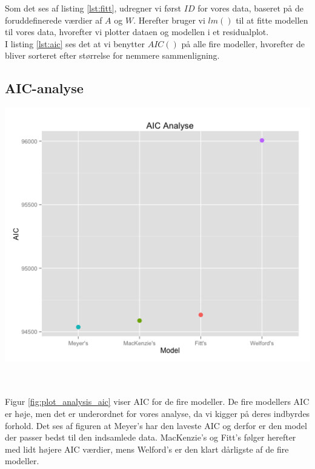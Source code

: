 Som det ses af listing \ref{lst:fitt}, udregner vi først $ID$ for vores data, baseret på de foruddefinerede værdier af $A$ og $W$. Herefter bruger vi $lm()$ til at fitte modellen til vores data, hvorefter vi plotter dataen og modellen i et residualplot.\\
I listing \ref{lst:aic} ses det at vi benytter $AIC()$ på alle fire modeller, hvorefter de bliver sorteret efter størrelse for nemmere sammenligning.

\subsection*{AIC-analyse}
\begin{minipage}{\textwidth}
	\centering
	\includegraphics[width=.75\textwidth]{images/plots/plot_analysis_aic}
	\label{fig:plot_analysis_aic}
\end{minipage}\\\\
Figur \ref{fig:plot_analysis_aic} viser AIC for de fire modeller. De fire modellers AIC er høje, men det er underordnet for vores analyse, da vi kigger på deres indbyrdes forhold. Det ses af figuren at Meyer's har den laveste AIC og derfor er den model der passer bedst til den indsamlede data. MacKenzie's og Fitt's følger herefter med lidt højere AIC værdier, mens Welford's er den klart dårligste af de fire modeller.

